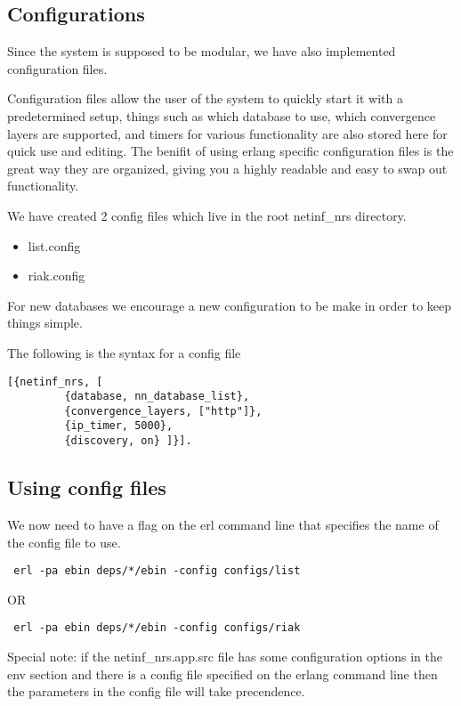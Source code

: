 \subsection {Configurations}

Since the system is supposed to be modular, we have also implemented configuration files. 

Configuration files allow the user of the system to quickly start it with a predetermined setup, things such as which database to use, which convergence layers are supported, and timers for various functionality are also stored here for quick use and editing. The benifit of using erlang specific configuration files is the great way they are organized, giving you a highly readable and easy to swap out functionality. 

We have created 2 config files which live in the root netinf\_nrs directory.

\begin {itemize}
\item list.config
\item riak.config
\end {itemize}

For new databases we encourage a new configuration to be make in order to keep things simple.


The following is the syntax for a config file 

\begin {verbatim}
[{netinf_nrs, [ 
	     {database, nn_database_list},
	     {convergence_layers, ["http"]},
	     {ip_timer, 5000},
	     {discovery, on} ]}].

\end{verbatim}

\subsection {Using config files}

We now need to have a flag on the erl command line that specifies the name of the config file to use. 

\begin {verbatim}
 erl -pa ebin deps/*/ebin -config configs/list
\end{verbatim}

OR

\begin {verbatim}
 erl -pa ebin deps/*/ebin -config configs/riak
\end{verbatim}

Special note: if the netinf\_nrs.app.src file has some configuration options in the env section and there is a config file specified on the erlang command line then the parameters in the config file  will take precendence.

